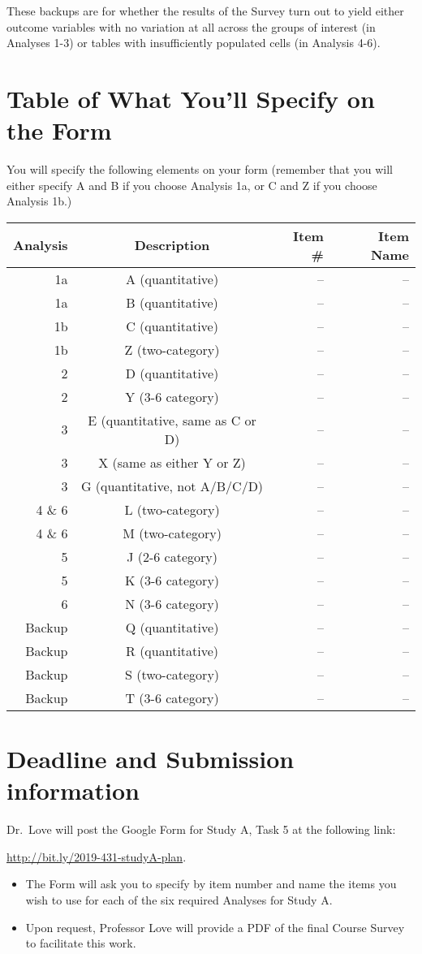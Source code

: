 \documentclass[]{book}
\providecommand{\tightlist}{%
  \setlength{\itemsep}{0pt}\setlength{\parskip}{0pt}}
\begin{document}
These backups are for whether the results of the Survey turn out to yield either outcome variables with no variation at all across the groups of interest (in Analyses 1-3) or tables with insufficiently populated cells (in Analysis 4-6).

\hypertarget{table-of-what-youll-specify-on-the-form}{%
\section{Table of What You'll Specify on the Form}\label{table-of-what-youll-specify-on-the-form}}

You will specify the following elements on your form (remember that you will either specify A and B if you choose Analysis 1a, or C and Z if you choose Analysis 1b.)

\begin{longtable}[]{@{}rcrr@{}}
\toprule
Analysis & Description & Item \# & Item Name\tabularnewline
\midrule
\endhead
1a & A (quantitative) & -- & --\tabularnewline
1a & B (quantitative) & -- & --\tabularnewline
1b & C (quantitative) & -- & --\tabularnewline
1b & Z (two-category) & -- & --\tabularnewline
2 & D (quantitative) & -- & --\tabularnewline
2 & Y (3-6 category) & -- & --\tabularnewline
3 & E (quantitative, same as C or D) & -- & --\tabularnewline
3 & X (same as either Y or Z) & -- & --\tabularnewline
3 & G (quantitative, not A/B/C/D) & -- & --\tabularnewline
4 \& 6 & L (two-category) & -- & --\tabularnewline
4 \& 6 & M (two-category) & -- & --\tabularnewline
5 & J (2-6 category) & -- & --\tabularnewline
5 & K (3-6 category) & -- & --\tabularnewline
6 & N (3-6 category) & -- & --\tabularnewline
Backup & Q (quantitative) & -- & --\tabularnewline
Backup & R (quantitative) & -- & --\tabularnewline
Backup & S (two-category) & -- & --\tabularnewline
Backup & T (3-6 category) & -- & --\tabularnewline
\bottomrule
\end{longtable}

\hypertarget{deadline-and-submission-information-7}{%
\section{Deadline and Submission information}\label{deadline-and-submission-information-7}}

Dr.~Love will post the Google Form for Study A, Task 5 at the following link:

\url{http://bit.ly/2019-431-studyA-plan}.

\begin{itemize}
\tightlist
\item
  The Form will ask you to specify by item number and name the items you wish to use for each of the six required Analyses for Study A.
\item
  Upon request, Professor Love will provide a PDF of the final Course Survey to facilitate this work.
\end{itemize}
\end{document}
